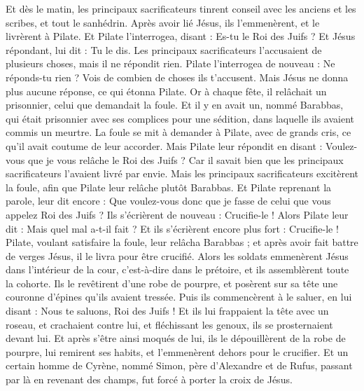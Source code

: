 \begin{multicols}{2}
\VerseOne{}Et dès le matin, les principaux sacrificateurs tinrent conseil avec les anciens et les scribes, et tout le sanhédrin. Après avoir lié Jésus, ils l'emmenèrent, et le livrèrent à Pilate.
Et Pilate l'interrogea, disant : Es-tu le Roi des Juifs ? Et Jésus répondant, lui dit : Tu le dis.
Les principaux sacrificateurs l'accusaient de plusieurs choses, mais il ne répondit rien.
Pilate l'interrogea de nouveau : Ne réponds-tu rien ? Vois de combien de choses ils t’accusent.
Mais Jésus ne donna plus aucune réponse, ce qui étonna Pilate.
Or à chaque fête, il relâchait un prisonnier, celui que demandait la foule.
Et il y en avait un, nommé Barabbas, qui était prisonnier avec ses complices pour une sédition, dans laquelle ils avaient commis un meurtre.
La foule se mit à demander à Pilate, avec de grands cris, ce qu’il avait coutume de leur accorder.
Mais Pilate leur répondit en disant : Voulez-vous que je vous relâche le Roi des Juifs ?
Car il savait bien que les principaux sacrificateurs l'avaient livré par envie.
Mais les principaux sacrificateurs excitèrent la foule, afin que Pilate leur relâche plutôt Barabbas.
Et Pilate reprenant la parole, leur dit encore : Que voulez-vous donc que je fasse de celui que vous appelez Roi des Juifs ?
Ils s'écrièrent de nouveau : Crucifie-le !
Alors Pilate leur dit : Mais quel mal a-t-il fait ? Et ils s'écrièrent encore plus fort : Crucifie-le !
Pilate, voulant satisfaire la foule, leur relâcha Barabbas ; et après avoir fait battre de verges Jésus, il le livra pour être crucifié.
Alors les soldats emmenèrent Jésus dans l’intérieur de la cour, c’est-à-dire dans le prétoire, et ils assemblèrent toute la cohorte.
Ils le revêtirent d'une robe de pourpre, et posèrent sur sa tête une couronne d'épines qu’ils avaient tressée.
Puis ils commencèrent à le saluer, en lui disant : Nous te saluons, Roi des Juifs !
Et ils lui frappaient la tête avec un roseau, et crachaient contre lui, et fléchissant les genoux, ils se prosternaient devant lui.
Et après s'être ainsi moqués de lui, ils le dépouillèrent de la robe de pourpre, lui remirent ses habits, et l'emmenèrent dehors pour le crucifier.
Et un certain homme de Cyrène, nommé Simon, père d’Alexandre et de Rufus, passant par là en revenant des champs, fut forcé à porter la croix de Jésus.

\end{multicols}
